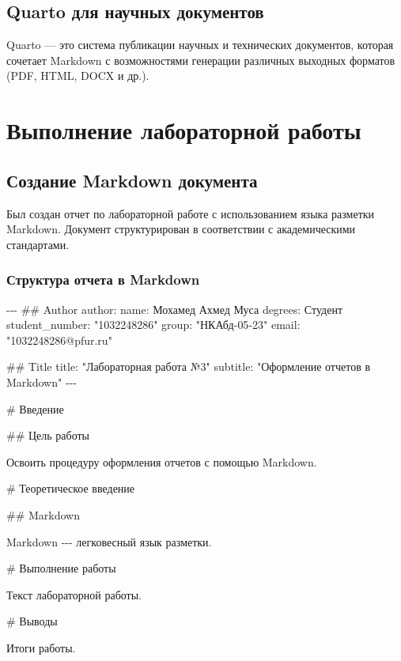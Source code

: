 \documentclass[
  12pt,
  a4paper,
  DIV=11,
  numbers=noendperiod]{scrreprt}
\newenvironment{Shaded}{\begin{snugshade}}{\end{snugshade}}
\newcommand{\AnnotationTok}[1]{\textcolor[rgb]{0.37,0.37,0.37}{#1}}
\newcommand{\CommentTok}[1]{\textcolor[rgb]{0.37,0.37,0.37}{#1}}
\newcommand{\FunctionTok}[1]{\textcolor[rgb]{0.28,0.35,0.67}{#1}}
\newcommand{\NormalTok}[1]{\textcolor[rgb]{0.00,0.23,0.31}{#1}}
\begin{document}
\section{Quarto для научных
документов}\label{quarto-ux434ux43bux44f-ux43dux430ux443ux447ux43dux44bux445-ux434ux43eux43aux443ux43cux435ux43dux442ux43eux432}

Quarto --- это система публикации научных и технических документов,
которая сочетает Markdown с возможностями генерации различных выходных
форматов (PDF, HTML, DOCX и др.).

\chapter{Выполнение лабораторной
работы}\label{ux432ux44bux43fux43eux43bux43dux435ux43dux438ux435-ux43bux430ux431ux43eux440ux430ux442ux43eux440ux43dux43eux439-ux440ux430ux431ux43eux442ux44b}

\section{Создание Markdown
документа}\label{ux441ux43eux437ux434ux430ux43dux438ux435-markdown-ux434ux43eux43aux443ux43cux435ux43dux442ux430}

Был создан отчет по лабораторной работе с использованием языка разметки
Markdown. Документ структурирован в соответствии с академическими
стандартами.

\subsection{Структура отчета в
Markdown}\label{ux441ux442ux440ux443ux43aux442ux443ux440ux430-ux43eux442ux447ux435ux442ux430-ux432-markdown}

\begin{Shaded}
\begin{Highlighting}[]
\CommentTok{{-}{-}{-}}
\CommentTok{\#\# Author}
\AnnotationTok{author:}
\CommentTok{  name: Мохамед Ахмед Муса}
\CommentTok{  degrees: Студент}
\CommentTok{  student\_number: "1032248286"}
\CommentTok{  group: "НКАбд{-}05{-}23"}
\CommentTok{  email: "1032248286@pfur.ru"}

\CommentTok{\#\# Title}
\AnnotationTok{title:}\CommentTok{ "Лабораторная работа №3"}
\AnnotationTok{subtitle:}\CommentTok{ "Оформление отчетов в Markdown"}
\CommentTok{{-}{-}{-}}

\FunctionTok{\# Введение}

\FunctionTok{\#\# Цель работы}

\NormalTok{Освоить процедуру оформления отчетов с помощью Markdown.}

\FunctionTok{\# Теоретическое введение}

\FunctionTok{\#\# Markdown}

\NormalTok{Markdown {-}{-}{-} легковесный язык разметки.}

\FunctionTok{\# Выполнение работы}

\NormalTok{Текст лабораторной работы.}

\FunctionTok{\# Выводы}

\NormalTok{Итоги работы.}
\end{Highlighting}
\end{Shaded}
\end{document}
